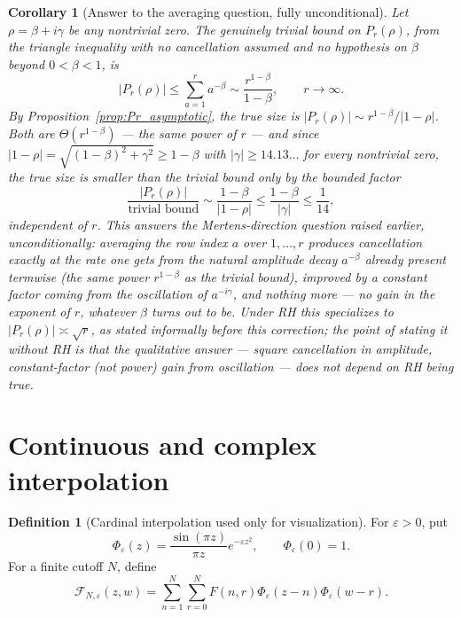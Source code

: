 \documentclass[11pt]{amsart}
\numberwithin{equation}{section}
\theoremstyle{plain}
\newtheorem{corollary}[theorem]{Corollary}
\theoremstyle{definition}
\newtheorem{definition}[theorem]{Definition}
\theoremstyle{remark}
\newcommand{\Fsurf}{F}
\begin{document}
\begin{corollary}[Answer to the averaging question, fully unconditional]
\label{cor:averaging_answer}
Let \(\rho=\beta+i\gamma\) be any nontrivial zero.  The genuinely trivial bound on \(P_r(\rho)\), from the triangle inequality with no cancellation assumed and no hypothesis on \(\beta\) beyond \(0<\beta<1\), is
\begin{equation}
|P_r(\rho)|\le\sum_{a=1}^ra^{-\beta}\sim\frac{r^{1-\beta}}{1-\beta},
\qquad r\to\infty.
\label{eq:Pr_trivial_bound}
\end{equation}
By Proposition~\ref{prop:Pr_asymptotic}, the true size is \(|P_r(\rho)|\sim r^{1-\beta}/|1-\rho|\).  Both are \(\Theta(r^{1-\beta})\) — \emph{the same power of \(r\)} — and since \(|1-\rho|=\sqrt{(1-\beta)^2+\gamma^2}\ge1-\beta\) with \(|\gamma|\ge14.13\ldots\) for every nontrivial zero, the true size is smaller than the trivial bound only by the bounded factor
\begin{equation}
\frac{|P_r(\rho)|}{\text{trivial bound}}\sim\frac{1-\beta}{|1-\rho|}\le\frac{1-\beta}{|\gamma|}\le\frac1{14},
\label{eq:averaging_ratio}
\end{equation}
independent of \(r\).  This answers the Mertens-direction question raised earlier, unconditionally: averaging the row index \(a\) over \(1,\ldots,r\) produces cancellation exactly at the rate one gets from the natural amplitude decay \(a^{-\beta}\) already present termwise (the same power \(r^{1-\beta}\) as the trivial bound), improved by a constant factor coming from the oscillation of \(a^{-i\gamma}\), and nothing more — no gain in the exponent of \(r\), whatever \(\beta\) turns out to be.  Under RH this specializes to \(|P_r(\rho)|\asymp\sqrt r\), as stated informally before this correction; the point of stating it without RH is that the qualitative answer — square cancellation in amplitude, constant-factor (not power) gain from oscillation — does not depend on RH being true.
\end{corollary}

\section{Continuous and complex interpolation}
\label{sec:interpolation}

\begin{definition}[Cardinal interpolation used only for visualization]
\label{def:cardinal_interpolation}
For \(\varepsilon>0\), put
\begin{equation}
\Phi_\varepsilon(z)=\frac{\sin(\pi z)}{\pi z}e^{-\varepsilon z^2},
\qquad \Phi_\varepsilon(0)=1.
\label{eq:Phi_epsilon}
\end{equation}
For a finite cutoff \(N\), define
\begin{equation}
\mathcal F_{N,\varepsilon}(z,w)=\sum_{n=1}^{N}\sum_{r=0}^{N}\Fsurf(n,r)\Phi_\varepsilon(z-n)\Phi_\varepsilon(w-r).
\label{eq:finite_cardinal_interpolation}
\end{equation}
\end{definition}
\end{document}
